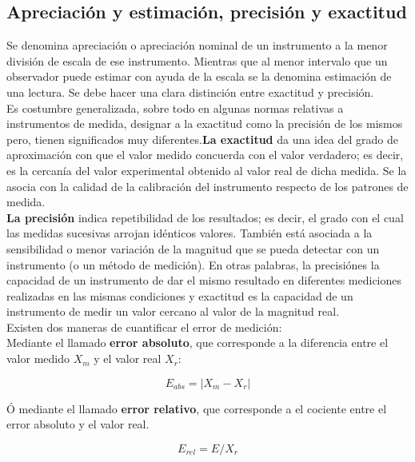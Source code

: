 \subsection{Apreciación y estimación, precisión y exactitud}

Se denomina apreciación o apreciación nominal de un instrumento a la menor división de escala de ese instrumento. Mientras que 
al menor intervalo que un observador puede estimar con ayuda de la escala se la denomina estimación de una lectura. Se  debe  
hacer  una  clara  distinción  entre exactitud  y precisión.\\

Es  costumbre  generalizada, sobre  todo  en  algunas  normas relativas  a  instrumentos  de  medida,  designar  a  la  exactitud  
como  la precisión de los mismos pero, tienen significados muy diferentes.\textbf{La exactitud} da una idea del grado de 
aproximación con que el valor medido concuerda con el valor  verdadero;  es  decir, es  la  cercanía  del  valor  experimental  
obtenido  al  valor  real  de  dicha medida. Se  la  asocia  con  la calidad  de  la  calibración  del  instrumento  respecto  
de  los  patrones  de medida.\\

\textbf{La precisión}  indica  repetibilidad  de  los  resultados;  es  decir,  el  grado  con  
el  cual  las  medidas sucesivas arrojan idénticos valores.  También está asociada a la sensibilidad o menor variación de la 
magnitud que se pueda detectar con un instrumento (o un método de medición). En otras palabras, la precisiónes la capacidad de un 
instrumento de dar el mismo resultado en diferentes  mediciones  realizadas  en  las  mismas  condiciones  y exactitud  es  la  
capacidad  de  un instrumento de medir un valor cercano al valor de la magnitud real.\\

Existen dos maneras de cuantificar el error de medición:\\

Mediante el llamado \textbf{error absoluto}, que corresponde a la diferencia entre el valor medido $X_m$ y el valor real $X_r$:

\begin{equation}
 E_{abs} = |X_m - X_r |
\end{equation}

Ó mediante  el  llamado \textbf{error  relativo},  que  corresponde  a  el  cociente  entre  el  error  absoluto  y  el valor 
real.

\begin{equation}
 E_{rel} =  E/X_r
 \end{equation}

